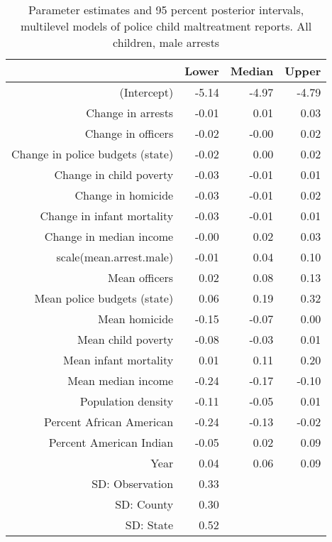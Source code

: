 \begin{table}[ht]
\centering
\begin{tabular}{rrrr}
  \hline
 & Lower & Median & Upper \\ 
  \hline
(Intercept) & -5.14 & -4.97 & -4.79 \\ 
  Change in arrests & -0.01 & 0.01 & 0.03 \\ 
  Change in officers & -0.02 & -0.00 & 0.02 \\ 
  Change in police budgets (state) & -0.02 & 0.00 & 0.02 \\ 
  Change in child poverty & -0.03 & -0.01 & 0.01 \\ 
  Change in homicide & -0.03 & -0.01 & 0.02 \\ 
  Change in infant mortality & -0.03 & -0.01 & 0.01 \\ 
  Change in median income & -0.00 & 0.02 & 0.03 \\ 
  scale(mean.arrest.male) & -0.01 & 0.04 & 0.10 \\ 
  Mean officers & 0.02 & 0.08 & 0.13 \\ 
  Mean police budgets (state) & 0.06 & 0.19 & 0.32 \\ 
  Mean homicide & -0.15 & -0.07 & 0.00 \\ 
  Mean child poverty & -0.08 & -0.03 & 0.01 \\ 
  Mean infant mortality & 0.01 & 0.11 & 0.20 \\ 
  Mean median income & -0.24 & -0.17 & -0.10 \\ 
  Population density & -0.11 & -0.05 & 0.01 \\ 
  Percent African American & -0.24 & -0.13 & -0.02 \\ 
  Percent American Indian & -0.05 & 0.02 & 0.09 \\ 
  Year & 0.04 & 0.06 & 0.09 \\ 
  SD: Observation & 0.33 &  &  \\ 
  SD: County & 0.30 &  &  \\ 
  SD: State & 0.52 &  &  \\ 
   \hline
\end{tabular}
\caption{Parameter estimates and 95 percent posterior intervals, multilevel models of 
             police child maltreatment reports. All children, male arrests} 
\end{table}
